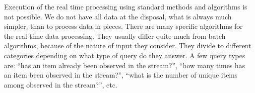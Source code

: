 Execution of the real time processing using standard methods and algorithms is not possible.
We do not have all data at the disposal, what is always much simpler, than to process data in pieces.
There are many specific algorithms for the real time data processing.
They usually differ quite much from batch algorithms, because of the nature of input they consider.
They divide to different categories depending on what type of query do they answer.
A few query types are: ``has an item already been observed in the stream?'', ``how many times has an item been observed in the stream?'', ``what is the number of unique items among observed in the stream?'', etc.



%